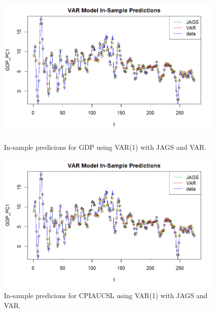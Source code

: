 \begin{figure}[H]
    \centering
    \begin{minipage}{0.49\textwidth}
        \centering
        \includegraphics[width=\textwidth]{images/6-VAR/VAR_predictions_gdp.png}
        \caption{In-sample predicions for GDP using VAR(1) with JAGS and VAR.}
        \label{fig:VAR_gdp_prediction}
    \end{minipage}\hfill
    \begin{minipage}{0.49\textwidth}
        \centering
        \includegraphics[width=\textwidth]{images/6-VAR/VAR_predictions_gdp.png}
        \caption{In-sample predicions for CPIAUCSL using VAR(1) with JAGS and VAR.}
        \label{fig:VAR_infl_prediction}
    \end{minipage}
\end{figure}
